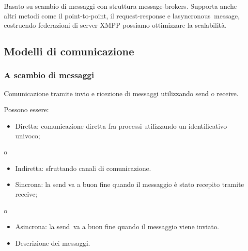 \documentclass[
]{article}
\providecommand{\tightlist}{%
  \setlength{\itemsep}{0pt}\setlength{\parskip}{0pt}}
\begin{document}
{Basato su scambio di messaggi con struttura message-brokers. Supporta
anche altri metodi come il point-to-point, il request-response e
}{l\textquotesingle asyncronous}{~message, costruendo federazioni di
server XMPP possiamo ottimizzare la scalabilità.}

{}

\subsection{\texorpdfstring{{Modelli di
comunicazione}}{Modelli di comunicazione}}\label{h.kfqc3jt943rc}

\subsubsection{\texorpdfstring{{A scambio di
messaggi}}{A scambio di messaggi}}\label{h.7cvvt0vso49r}

{Comunicazione tramite invio e ricezione di messaggi utilizzando send o
receive.}

{}

{Possono essere:}

\begin{itemize}
\tightlist
\item
  {Diretta}{: comunicazione diretta fra processi utilizzando un
  identificativo univoco;}
\end{itemize}

{o}

\begin{itemize}
\tightlist
\item
  {Indiretta}{: sfruttando canali di comunicazione.}
\end{itemize}

{}

{}

\begin{itemize}
\tightlist
\item
  {Sincrona}{: la send va a buon fine quando il messaggio è stato
  recepito tramite receive;}
\end{itemize}

{o}

\begin{itemize}
\tightlist
\item
  {Asincrona}{: la }{send}{~va a buon fine quando il messaggio viene
  inviato.}
\end{itemize}

{}

{}

\begin{itemize}
\tightlist
\item
  {Descrizione dei messaggi.}
\end{itemize}
\end{document}
